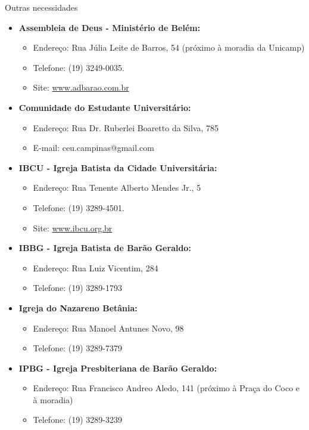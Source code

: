 \begin{story}{Outras necessidades}
\begin{itemize}
\item \textbf{Assembleia de Deus - Ministério de Belém:}
\begin{itemize}
\item Endereço: Rua Júlia Leite de Barros, 54 (próximo à moradia da Unicamp)
\item Telefone: (19) 3249-0035.
\item Site: \url{www.adbarao.com.br}
\end{itemize}

\item \textbf{Comunidade do Estudante Universitário:}
\begin{itemize}
\item Endereço: Rua Dr. Ruberlei Boaretto da Silva, 785
\item E-mail: ceu.campinas@gmail.com
\end{itemize}

\item \textbf{IBCU - Igreja Batista da Cidade Universitária:}
\begin{itemize}
\item Endereço: Rua Tenente Alberto Mendes Jr., 5
\item Telefone: (19) 3289-4501.
\item Site: \url{www.ibcu.org.br}
\end{itemize}

\item \textbf{IBBG - Igreja Batista de Barão Geraldo:}
\begin{itemize}
\item Endereço: Rua Luiz Vicentim, 284
\item Telefone: (19) 3289-1793
\end{itemize}

\item \textbf{Igreja do Nazareno Betânia:}
\begin{itemize}
\item Endereço: Rua Manoel Antunes Novo, 98
\item Telefone: (19) 3289-7379
\end{itemize}

\item \textbf{IPBG - Igreja Presbiteriana de Barão Geraldo:}
\begin{itemize}
\item Endereço: Rua Francisco Andreo Aledo, 141 (próximo à Praça do Coco e à moradia)
\item Telefone: (19) 3289-3239
\end{itemize}


\end{itemize}
\end{story}

